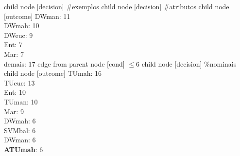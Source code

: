 child {node [decision] {\#exemplos}
child {node [decision] {\#atributos}
child {node [outcome] {
DWman: 11\\
DWmah: 10\\
DWeuc: 9\\
Ent: 7\\
Mar: 7\\
demais: 17} edge from parent node [cond] {$\leq6$}}
child {node [decision] {\%nominais}
child {node [outcome] {
TUmah: 16\\
TUeuc: 13\\
Ent: 10\\
TUman: 10\\
Mar: 9\\
DWmah: 6\\
SVMbal: 6\\
DWman: 6\\
\textbf{ATUmah}: 6\\
}}}}}

